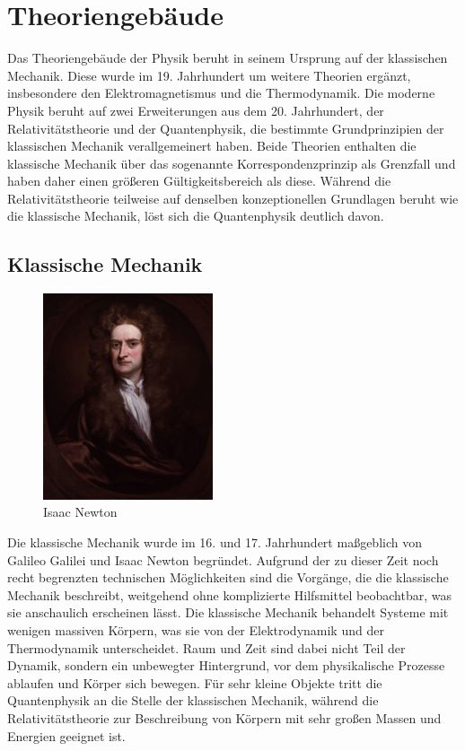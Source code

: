 \documentclass[titlepage, parkskip=full, twocolumn, landscape]{scrartcl}
\begin{document}
\section{Theoriengebäude}

Das Theoriengebäude der Physik beruht in seinem Ursprung auf der klassischen Mechanik. Diese wurde im 19. Jahrhundert um weitere Theorien ergänzt, insbesondere den Elektromagnetismus und die Thermodynamik. Die moderne Physik beruht auf zwei Erweiterungen aus dem 20. Jahrhundert, der Relativitätstheorie und der Quantenphysik, die bestimmte Grundprinzipien der klassischen Mechanik verallgemeinert haben. Beide Theorien enthalten die klassische Mechanik über das sogenannte Korrespondenzprinzip als Grenzfall und haben daher einen größeren Gültigkeitsbereich als diese. Während die Relativitätstheorie teilweise auf denselben konzeptionellen Grundlagen beruht wie die klassische Mechanik, löst sich die Quantenphysik deutlich davon.

\subsection{Klassische Mechanik}

\begin{figure}
	\centering
	\includegraphics[width=5cm]{images/4.jpg}
	\caption{Isaac Newton}
\end{figure}

Die klassische Mechanik wurde im 16. und 17. Jahrhundert maßgeblich von Galileo Galilei und Isaac Newton begründet. Aufgrund der zu dieser Zeit noch recht begrenzten technischen Möglichkeiten sind die Vorgänge, die die klassische Mechanik beschreibt, weitgehend ohne komplizierte Hilfsmittel beobachtbar, was sie anschaulich erscheinen lässt. Die klassische Mechanik behandelt Systeme mit wenigen massiven Körpern, was sie von der Elektrodynamik und der Thermodynamik unterscheidet. Raum und Zeit sind dabei nicht Teil der Dynamik, sondern ein unbewegter Hintergrund, vor dem physikalische Prozesse ablaufen und Körper sich bewegen. Für sehr kleine Objekte tritt die Quantenphysik an die Stelle der klassischen Mechanik, während die Relativitätstheorie zur Beschreibung von Körpern mit sehr großen Massen und Energien geeignet ist.
\end{document}
